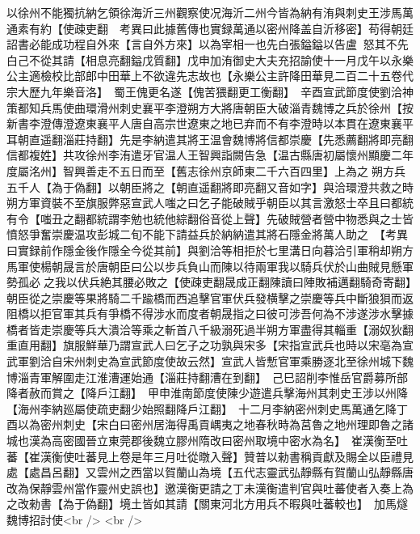 以徐州不能獨抗納乞領徐海沂三州觀察使况海沂二州今皆為納有洧與刺史王涉馬萬通素有約【使疎吏翻　考異曰此據舊傳也實録萬通以密州降盖自沂移密】苟得朝廷詔書必能成功程自外來【言自外方來】以為宰相一也先白張鎰鎰以告盧怒其不先白己不從其請【相息亮翻鎰戊質翻】戊申加洧御史大夫充招諭使十一月戊午以永樂公主適檢校比部郎中田華上不欲違先志故也【永樂公主許降田華見二百二十五卷代宗大歷九年樂音洛】　蜀王傀更名遂【傀苦猥翻更工衡翻】　辛酉宣武節度使劉洽神策都知兵馬使曲環滑州刺史襄平李澄朔方大將唐朝臣大破淄青魏博之兵於徐州【按新書李澄傳澄遼東襄平人唐自高宗世遼東之地已弃而不有李澄時以本貫在遼東襄平耳朝直遥翻淄莊持翻】先是李納遣其將王温會魏博將信都崇慶【先悉薦翻將即亮翻信都複姓】共攻徐州李洧遣牙官温人王智興詣闕告急【温古縣唐初屬懷州顯慶二年度屬洺州】智興善走不五日而至【舊志徐州京師東二千六百四里】上為之朔方兵五千人【為于偽翻】以朝臣將之【朝直遥翻將即亮翻又音如字】與洽環澄共救之時朔方軍資裝不至旗服弊惡宣武人嗤之曰乞子能破賊乎朝臣以其言激怒士卒且曰都統有令【嗤丑之翻都統謂李勉也統他綜翻俗音從上聲】先破賊營者營中物悉與之士皆憤怒爭奮崇慶温攻彭城二旬不能下請益兵於納納遣其將石隱金將萬人助之　【考異曰實録前作隱金後作隱全今從其前】與劉洽等相拒於七里溝日向暮洽引軍稍却朔方馬軍使楊朝晟言於唐朝臣曰公以步兵負山而陳以待兩軍我以騎兵伏於山曲賊見懸軍勢孤必之我以伏兵絶其腰必敗之【使疎吏翻晟成正翻陳讀曰陣敗補邁翻騎奇寄翻】朝臣從之崇慶等果將騎二千踰橋而西追擊官軍伏兵發横擊之崇慶等兵中斷狼狽而返阻橋以拒官軍其兵有爭橋不得涉水而度者朝晟指之曰彼可涉吾何為不涉遂涉水擊據橋者皆走崇慶等兵大潰洽等乘之斬首八千級溺死過半朔方軍盡得其輜重【溺奴狄翻重直用翻】旗服鮮華乃謂宣武人曰乞子之功孰與宋多【宋指宣武兵也時以宋亳為宣武軍劉洽自宋州刺史為宣武節度使故云然】宣武人皆慙官軍乘勝逐北至徐州城下魏博淄青軍解圍走江淮漕運始通【淄莊持翻漕在到翻】　己巳詔削李惟岳官爵募所部降者赦而賞之【降戶江翻】　甲申淮南節度使陳少遊遣兵擊海州其刺史王涉以州降【海州李納廵屬使疏吏翻少始照翻降戶江翻】　十二月李納密州刺史馬萬通乞降丁酉以為密州刺史【宋白曰密州居海得禹貢嵎夷之地春秋時為莒魯之地州理即魯之諸城也漢為高密國晉立東莞郡後魏立膠州隋改曰密州取境中密水為名】　崔漢衡至吐蕃【崔漢衡使吐蕃見上卷是年三月吐從暾入聲】贊普以勑書稱貢獻及賜全以臣禮見處【處昌呂翻】又雲州之西當以賀蘭山為境【五代志靈武弘靜縣有賀蘭山弘靜縣唐改為保靜雲州當作靈州史誤也】邀漢衡更請之丁未漢衡遣判官與吐蕃使者入奏上為之改勑書【為于偽翻】境土皆如其請【關東河北方用兵不暇與吐蕃較也】　加馬燧魏博招討使<br />
<br />

